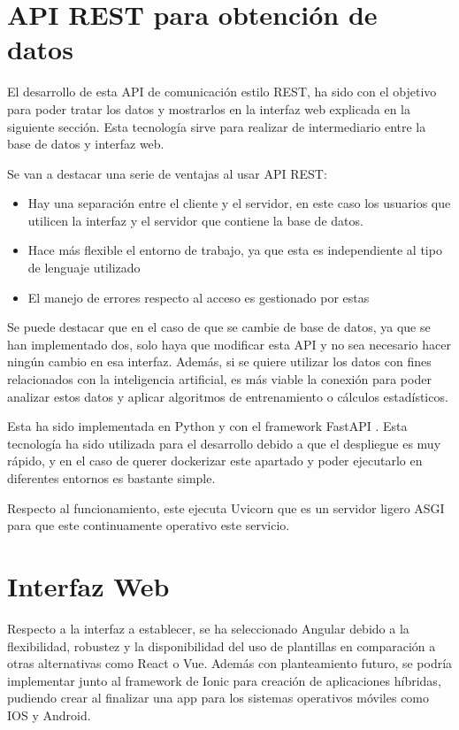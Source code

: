 \section{API REST para obtención de datos}

El desarrollo de esta API de comunicación estilo \ac{REST}, ha sido con el objetivo para poder tratar los datos y mostrarlos en la interfaz web explicada en la siguiente sección. Esta tecnología sirve para realizar de intermediario entre la base de datos y interfaz web.

Se van a destacar una serie de ventajas al usar API REST:

\begin{itemize}
    \item Hay una separación entre el cliente y el servidor, en este caso los usuarios que utilicen la interfaz y el servidor que contiene la base de datos.
    \item Hace más flexible el entorno de trabajo, ya que esta es independiente al tipo de lenguaje utilizado
    \item El manejo de errores respecto al acceso es gestionado por estas
\end{itemize}

Se puede destacar que en el caso de que se cambie de base de datos, ya que se han implementado dos, solo haya que modificar esta API y no sea necesario hacer ningún cambio en esa interfaz. Además, si se quiere utilizar los datos con fines relacionados con la inteligencia artificial, es más viable la conexión para poder analizar estos datos y aplicar algoritmos de entrenamiento o cálculos estadísticos.

Esta ha sido implementada en Python y con el framework FastAPI \cite{fastapi}. Esta tecnología ha sido utilizada para el desarrollo debido a que el despliegue es muy rápido, y en el caso de querer dockerizar este apartado y poder ejecutarlo en diferentes entornos es bastante simple.

Respecto al funcionamiento, este ejecuta Uvicorn \cite{uvicorn} que es un servidor ligero \ac{ASGI} para que este continuamente operativo este servicio.

\section{Interfaz Web}

Respecto a la interfaz a establecer, se ha seleccionado Angular \cite{angular} debido a la flexibilidad, robustez y la disponibilidad del uso de plantillas en comparación a otras alternativas como React o Vue. Además con planteamiento futuro, se podría implementar junto al framework de Ionic para creación de aplicaciones híbridas, pudiendo crear al finalizar una app para los sistemas operativos móviles como IOS y Android.

